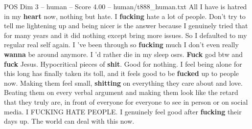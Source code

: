 \begin{textsample}{POS Dim 3 – human – Score 4.00 – human/t888\_human.txt}  \label{ex:f3_pos_002}
All I have is hatred in my \textbf{heart} now, nothing but hate.
I \textbf{fucking} hate a lot of people.
Don't try to tell me lightening up and being nicer is the answer because I genuinely tried that for many years and it did nothing except bring more issues.
So I defaulted to my regular real self again.
I ’ve been through so \textbf{fucking} much I don't even really \textbf{wanna} be around anymore.
I ’d rather die in my sleep osrs. \textbf{Fuck} god btw and \textbf{fuck} Jesus.
Hypocritical pieces of \textbf{shit}.
Good for nothing.
I feel being alone for this long has finally taken its toll, and it feels good to be \textbf{fucked} up to people now.
Making them feel small, \textbf{shitting} on everything they care about and love.
Beating them on every verbal argument and making them look like the retard that they truly are, in front of everyone for everyone to see in person or on social media.
I FUCKING HATE PEOPLE.
I genuinely feel good after \textbf{fucking} their days up.
The world can deal with this now.

\end{textsample}
